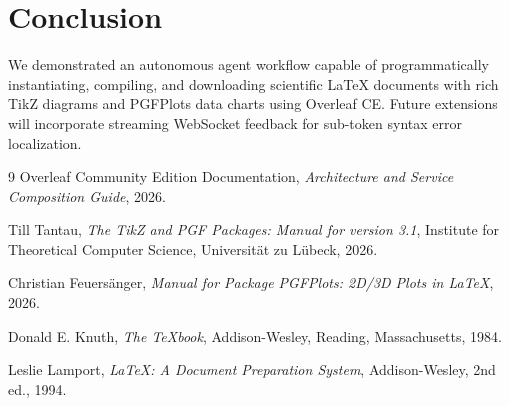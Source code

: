 \documentclass[11pt,a4paper]{article}
\begin{document}
\section{Conclusion}
\label{sec:conclusion}
We demonstrated an autonomous agent workflow capable of programmatically instantiating, compiling, and downloading scientific LaTeX documents with rich TikZ diagrams and PGFPlots data charts using Overleaf CE. Future extensions will incorporate streaming WebSocket feedback for sub-token syntax error localization.

\begin{thebibliography}{9}
Overleaf Community Edition Documentation, 
\emph{Architecture and Service Composition Guide}, 2026.

Till Tantau,
\emph{The TikZ and PGF Packages: Manual for version 3.1},
Institute for Theoretical Computer Science, Universität zu Lübeck, 2026.

Christian Feuersänger,
\emph{Manual for Package PGFPlots: 2D/3D Plots in \LaTeX}, 2026.

Donald E. Knuth,
\emph{The \TeX book},
Addison-Wesley, Reading, Massachusetts, 1984.

Leslie Lamport,
\emph{\LaTeX: A Document Preparation System},
Addison-Wesley, 2nd ed., 1994.
\end{thebibliography}
\end{document}
